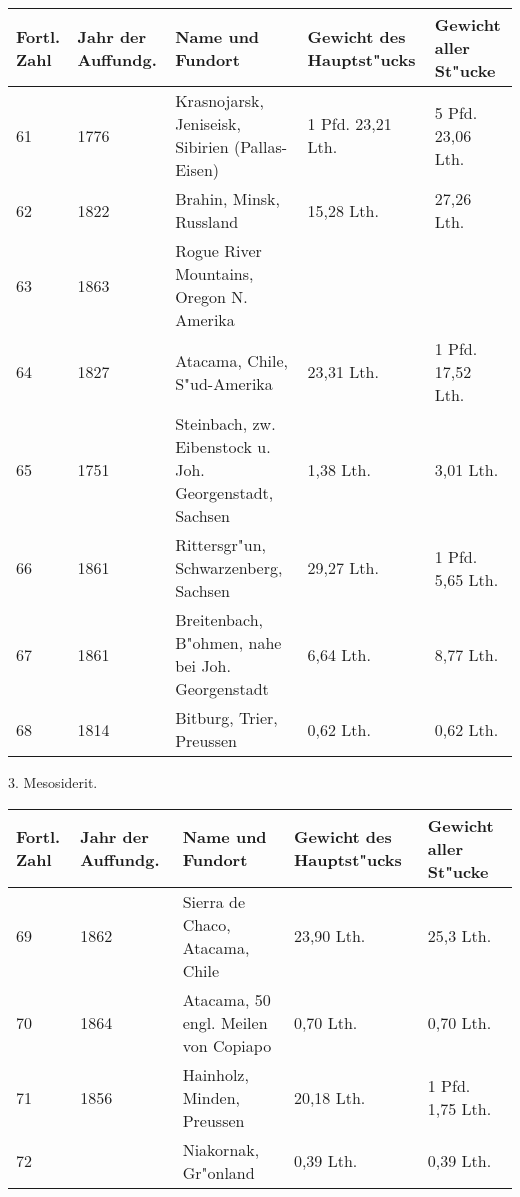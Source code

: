 \documentclass[a4paper, 11pt, oneside]{article}
\begin{document}
\begin{center}
\begin{footnotesize}
\begin{tabular}{ |p{7mm}|p{9mm}|p{55mm}|p{24mm}|p{24mm}| }
    \hline
    Fortl. Zahl & Jahr der Auffundg. & Name und Fundort & Gewicht des Hauptst"ucks & Gewicht aller St"ucke\\
    \hline\hline
    61 & 1776 & Krasnojarsk, Jeniseisk, Sibirien (Pallas-Eisen) & 1 Pfd. 23,21 Lth. & 5 Pfd. 23,06 Lth.\\\hline
    62 & 1822 & Brahin, Minsk, Russland & 15,28 Lth. & 27,26 Lth.\\\hline
    63 & 1863 & Rogue River Mountains, Oregon N. Amerika &  & \\\hline
    64 & 1827 & Atacama, Chile, S"ud-Amerika & 23,31 Lth. & 1 Pfd. 17,52 Lth.\\\hline
    65 & 1751 & Steinbach, zw. Eibenstock u. Joh. Georgenstadt, Sachsen & 1,38 Lth. & 3,01 Lth.\\\hline
    66 & 1861 & Rittersgr"un, Schwarzenberg, Sachsen & 29,27 Lth. & 1 Pfd. 5,65 Lth.\\\hline
    67 & 1861 & Breitenbach, B"ohmen, nahe bei Joh. Georgenstadt & 6,64 Lth. & 8,77 Lth.\\\hline
    68 & 1814 & Bitburg, Trier, Preussen & 0,62 Lth. & 0,62 Lth.\\
    \hline
\end{tabular}
\end{footnotesize}
\end{center}
\begin{center}
3. Mesosiderit.
\end{center}
\begin{center}
\begin{footnotesize}
\begin{tabular}{ |p{7mm}|p{9mm}|p{55mm}|p{24mm}|p{24mm}| }
    \hline
    Fortl. Zahl & Jahr der Auffundg. & Name und Fundort & Gewicht des Hauptst"ucks & Gewicht aller St"ucke\\
    \hline\hline
    69 & 1862 & Sierra de Chaco, Atacama, Chile & 23,90 Lth. & 25,3 Lth.\\\hline
    70 & 1864 & Atacama, 50 engl. Meilen von Copiapo & 0,70 Lth. & 0,70 Lth.\\\hline
    71 & 1856 & Hainholz, Minden, Preussen & 20,18 Lth. & 1 Pfd. 1,75 Lth.\\\hline
    72 &  & Niakornak, Gr"onland & 0,39 Lth. & 0,39 Lth.\\
    \hline
\end{tabular}
\end{footnotesize}
\end{center}
\end{document}
